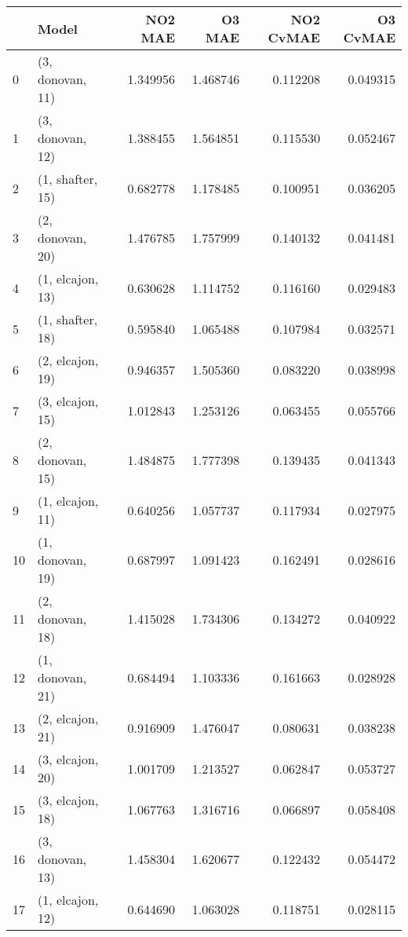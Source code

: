 \begin{tabular}{llrrrr}
\toprule
{} &             Model &   NO2 MAE &    O3 MAE &  NO2 CvMAE &  O3 CvMAE \\
\midrule
0  &  (3, donovan, 11) &  1.349956 &  1.468746 &   0.112208 &  0.049315 \\
1  &  (3, donovan, 12) &  1.388455 &  1.564851 &   0.115530 &  0.052467 \\
2  &  (1, shafter, 15) &  0.682778 &  1.178485 &   0.100951 &  0.036205 \\
3  &  (2, donovan, 20) &  1.476785 &  1.757999 &   0.140132 &  0.041481 \\
4  &  (1, elcajon, 13) &  0.630628 &  1.114752 &   0.116160 &  0.029483 \\
5  &  (1, shafter, 18) &  0.595840 &  1.065488 &   0.107984 &  0.032571 \\
6  &  (2, elcajon, 19) &  0.946357 &  1.505360 &   0.083220 &  0.038998 \\
7  &  (3, elcajon, 15) &  1.012843 &  1.253126 &   0.063455 &  0.055766 \\
8  &  (2, donovan, 15) &  1.484875 &  1.777398 &   0.139435 &  0.041343 \\
9  &  (1, elcajon, 11) &  0.640256 &  1.057737 &   0.117934 &  0.027975 \\
10 &  (1, donovan, 19) &  0.687997 &  1.091423 &   0.162491 &  0.028616 \\
11 &  (2, donovan, 18) &  1.415028 &  1.734306 &   0.134272 &  0.040922 \\
12 &  (1, donovan, 21) &  0.684494 &  1.103336 &   0.161663 &  0.028928 \\
13 &  (2, elcajon, 21) &  0.916909 &  1.476047 &   0.080631 &  0.038238 \\
14 &  (3, elcajon, 20) &  1.001709 &  1.213527 &   0.062847 &  0.053727 \\
15 &  (3, elcajon, 18) &  1.067763 &  1.316716 &   0.066897 &  0.058408 \\
16 &  (3, donovan, 13) &  1.458304 &  1.620677 &   0.122432 &  0.054472 \\
17 &  (1, elcajon, 12) &  0.644690 &  1.063028 &   0.118751 &  0.028115 \\
\bottomrule
\end{tabular}
